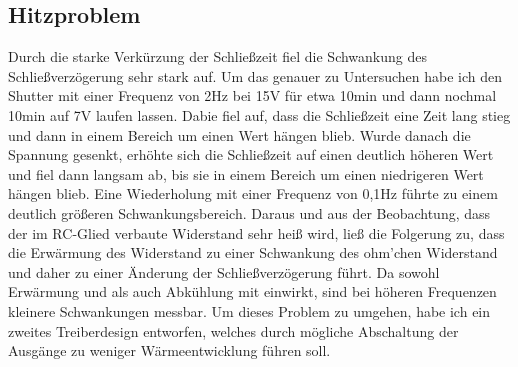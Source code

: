 \subsection{Hitzproblem}

Durch die starke Verkürzung der Schließzeit fiel die Schwankung des Schließverzögerung sehr stark auf. Um das genauer zu Untersuchen habe ich den Shutter mit einer Frequenz von 2Hz bei 15V für etwa 10min und dann nochmal 10min auf 7V laufen lassen. Dabie fiel auf, dass die Schließzeit eine Zeit lang stieg und dann in einem Bereich um einen Wert hängen blieb. Wurde danach die Spannung gesenkt, erhöhte sich die Schließzeit auf einen deutlich höheren Wert und fiel dann langsam ab, bis sie in einem Bereich um einen niedrigeren Wert hängen blieb. Eine Wiederholung mit einer Frequenz von 0,1Hz führte zu einem deutlich größeren Schwankungsbereich. %
Daraus und aus der Beobachtung, dass der im RC-Glied verbaute Widerstand sehr heiß wird, ließ die Folgerung zu, dass die Erwärmung des Widerstand zu einer Schwankung des ohm'chen Widerstand und daher zu einer Änderung der Schließverzögerung führt. Da sowohl Erwärmung und als auch Abkühlung mit einwirkt, sind bei höheren Frequenzen kleinere Schwankungen messbar. Um dieses Problem zu umgehen, habe ich ein zweites Treiberdesign entworfen, welches durch mögliche Abschaltung der Ausgänge zu weniger Wärmeentwicklung führen soll.

